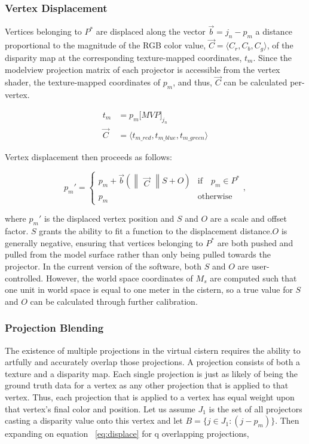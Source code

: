 \documentclass[twocolumn]{article}
\begin{document}
\subsubsection{Vertex Displacement}

Vertices belonging to $P^{*}$ are displaced along the vector $\vec{b} = j_{n} - p_{m}$ a distance proportional to the magnitude of the RGB color value, $\vec{C} = \langle C_{r}, C_{b}, C_{g} \rangle$, of the disparity map at the corresponding texture-mapped coordinates, $t_m$. Since the modelview projection matrix of each projector is accessible from the vertex shader, the texture-mapped coordinates of $p_m$, and thus, $\vec{C}$ can be calculated per-vertex.

\begin{align}
t_{m} &= p_{m}\lbrack MVP \rbrack _{j_{n}} \\
\vec{C} &= \langle t_{m\_red}, t_{m\_blue}, t_{m\_green} \rangle
\end{align}

Vertex displacement then proceeds as follows:

\begin{equation}
p_{m}' = \left \{ 
\begin{array}{ll}
p_{m} + \vec{b} (\begin{Vmatrix}\vec{C}\end{Vmatrix} S + O) & \text{if} \quad p_{m} \in P^{*}\\
p_{m} & \text{otherwise}
\end{array},\right.
\label{eq:displace}
\end{equation}

where $p_{m}'$ is the displaced vertex position and $S$ and $O$ are a scale and offset factor. $S$ grants the ability to fit a function to the displacement distance.$O$ is generally negative, ensuring that vertices belonging to $P^{*}$ are both pushed and pulled from the model surface rather than only being pulled towards the projector. In the current version of the software, both $S$ and $O$ are user-controlled. However, the world space coordinates of $M_s$ are computed such that one unit in world space is equal to one meter in the cistern, so a true value for $S$ and $O$ can be calculated through further calibration.
 
 \subsubsection{Projection Blending}

The existence of multiple projections in the virtual cistern requires the ability to artfully and accurately overlap those projections.
A projection consists of both a texture and a disparity map.
Each single projection is just as likely of being the ground truth data for a vertex as any other projection that is applied to that vertex. 
Thus, each projection that is applied to a vertex has equal weight upon that vertex's final color and position.
Let us assume $J_1$ is the set of all projectors casting a disparity value onto this vertex and let $B = \{j \in J_1 : (j - p_m)\}$. 
Then expanding on equation ~\ref{eq:displace} for q overlapping projections,
\end{document}
